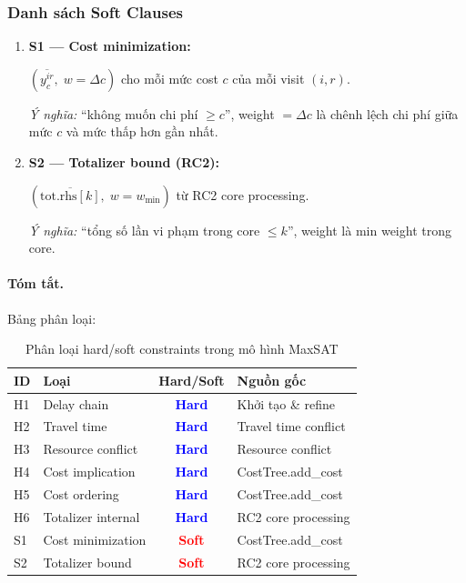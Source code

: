 \documentclass[11pt,a4paper]{article}
\begin{document}
\subsubsection{Danh sách Soft Clauses}

\begin{enumerate}
  \item \textbf{S1 --- Cost minimization:}
  \begin{softbox}
  $(\overline{y_c^{ir}}, \; w = \Delta c)$ \quad cho mỗi mức cost $c$ của mỗi visit $(i,r)$.
  \end{softbox}
  \emph{Ý nghĩa:} ``không muốn chi phí $\geq c$'', weight $= \Delta c$ là chênh lệch chi phí giữa mức $c$ và mức thấp hơn gần nhất.

  \item \textbf{S2 --- Totalizer bound (RC2):}
  \begin{softbox}
  $(\overline{\text{tot.rhs}[k]}, \; w = w_{\min})$ \quad từ RC2 core processing.
  \end{softbox}
  \emph{Ý nghĩa:} ``tổng số lần vi phạm trong core $\leq k$'', weight là min weight trong core.
\end{enumerate}

\paragraph{Tóm tắt.} Bảng phân loại:

\begin{table}[h]
\centering
\begin{tabular}{llcl}
\toprule
\textbf{ID} & \textbf{Loại} & \textbf{Hard/Soft} & \textbf{Nguồn gốc} \\
\midrule
H1 & Delay chain & \textcolor{blue}{\textbf{Hard}} & Khởi tạo \& refine \\
H2 & Travel time & \textcolor{blue}{\textbf{Hard}} & Travel time conflict \\
H3 & Resource conflict & \textcolor{blue}{\textbf{Hard}} & Resource conflict \\
H4 & Cost implication & \textcolor{blue}{\textbf{Hard}} & CostTree.add\_cost \\
H5 & Cost ordering & \textcolor{blue}{\textbf{Hard}} & CostTree.add\_cost \\
H6 & Totalizer internal & \textcolor{blue}{\textbf{Hard}} & RC2 core processing \\
\midrule
S1 & Cost minimization & \textcolor{red}{\textbf{Soft}} & CostTree.add\_cost \\
S2 & Totalizer bound & \textcolor{red}{\textbf{Soft}} & RC2 core processing \\
\bottomrule
\end{tabular}
\caption{Phân loại hard/soft constraints trong mô hình MaxSAT}
\end{table}
\end{document}

